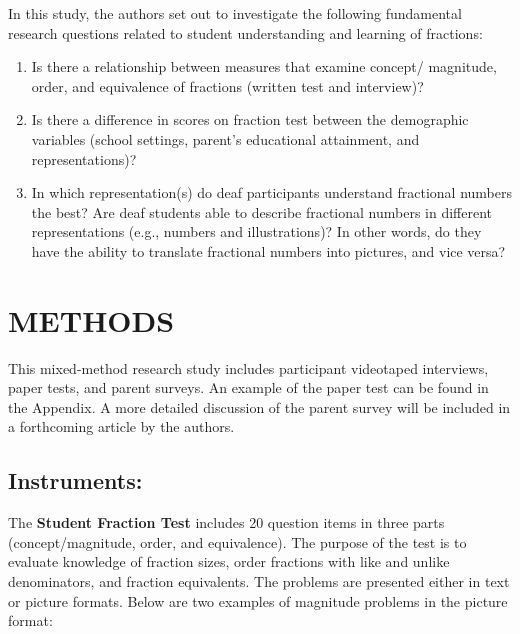 \documentclass[11.5pt]{sig-alternate} %
\begin{document}
\begin{large}
In this study, the authors set out to investigate the following fundamental research questions related to student understanding and learning of fractions:

 \begin{enumerate}
     \item Is there a relationship between measures that examine concept/ magnitude, order, and equivalence of fractions (written test and interview)?
     \item Is there a difference in scores on fraction test between the demographic variables (school settings, parent’s educational attainment, and representations)?
     \item In which representation(s) do deaf participants understand fractional numbers the best? Are deaf students able to describe fractional numbers in different representations (e.g., numbers and illustrations)? In other words, do they have the ability to translate fractional numbers into pictures, and vice versa?
 \end{enumerate}
 
\section*{METHODS}

This mixed-method research study includes participant videotaped interviews, paper tests, and parent surveys. An example of the paper test can be found in the Appendix. A more detailed discussion of the parent survey will be included in a forthcoming article by the authors.

\subsection*{Instruments:}

The \textbf{Student Fraction Test} includes 20 question items in three parts (concept/magnitude, order, and equivalence). The purpose of the test is to evaluate knowledge of fraction sizes, order fractions with like and unlike denominators, and fraction equivalents. The problems are presented either in text or picture formats. Below are two examples of magnitude problems in the picture format: 


\end{large}
\end{document}
